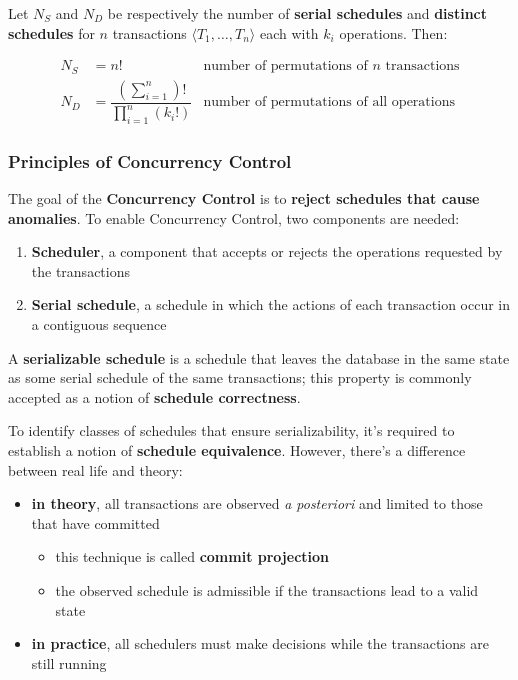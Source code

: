 \documentclass[english]{article}
\begin{document}
Let \(N_S\) and \(N_D\) be respectively the number of \textbf{serial schedules} and \textbf{distinct schedules} for \(n\) transactions \(\langle T_1, \dots, T_n \rangle\) each with \(k_i\) operations.
Then:

\begin{align*}
  N_S & = n!                                                                                        \quad & \text{number of permutations of } n \text{ transactions} \\
  N_D & = \dfrac{\displaystyle \left(\sum_{i=1}^{n}\right)!}{\displaystyle \prod_{i=1}^{n} (k_i!)}        & \text{number of permutations of all operations}
\end{align*}

\subsubsection{Principles of Concurrency Control}

The goal of the \textbf{Concurrency Control} is to \textbf{reject schedules that cause anomalies}.
To enable Concurrency Control, two components are needed:

\begin{enumerate}
  \item \textbf{Scheduler}, a component that accepts or rejects the operations requested by the transactions
  \item \textbf{Serial schedule}, a schedule in which the actions of each transaction occur in a contiguous sequence
\end{enumerate}

\bigskip
A \textbf{serializable schedule} is a schedule that leaves the database in the same state as some serial schedule of the same transactions;
this property is commonly accepted as a notion of \textbf{schedule correctness}.

To identify classes of schedules that ensure serializability, it's required to establish a notion of \textbf{schedule equivalence}.
However, there's a difference between real life and theory:

\begin{itemize}
  \item \textbf{in theory}, all transactions are observed \textit{a posteriori} and limited to those that have committed
        \begin{itemize}
          \item this technique is called \textbf{commit projection}
          \item the observed schedule is admissible if the transactions lead to a valid state
        \end{itemize}
  \item \textbf{in practice}, all schedulers must make decisions while the transactions are still running
\end{itemize}
\end{document}
